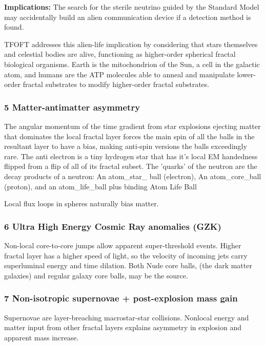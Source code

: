\documentclass[11pt,a4paper]{article}
\begin{document}
      \noindent\textbf{Implications:} The search for the sterile neutrino guided by the Standard Model may accidentally build an alien communication device if a detection method is found.

      TFOFT addresses this alien-life implication by considering that stars themselves and celestial bodies are alive, functioning as higher-order spherical fractal biological organisms. Earth is the mitochondrion of the Sun, a cell in the galactic atom, and humans are the ATP molecules able to anneal and manipulate lower-order fractal substrates to modify higher-order fractal substrates.

    \subsubsection{
    5 Matter-antimatter asymmetry
    }
      The angular momentum of the time gradient from star explosions ejecting matter that dominates the local fractal layer forces the main spin of all the balls in the resultant layer to have a bias, making anti-spin versions the balls exceedingly rare. The anti electron is a tiny hydrogen star that has it's local EM handedness flipped from a flip of all of its fractal subset. The 'quarks' of the neutron are the decay products of a neutron: An atom\_star\_ ball (electron), An atom\_core\_ball (proton), and an atom\_life\_ball plus binding  Atom Life Ball

      Local flux loops in spheres naturally bias matter.


    \subsubsection{
    6 Ultra High Energy Cosmic Ray anomalies (GZK) 
    }
      Non-local core-to-core jumps allow apparent super-threshold events. Higher fractal layer has a higher speed of light, so the velocity of incoming jets carry superluminal energy and time dilation. Both Nude core balls, (the dark matter galaxies) and regular galaxy core balls, may be the source.  


    \subsubsection{
    7 Non-isotropic supernovae + post-explosion mass gain 
    }
       Supernovae are layer-breaching macrostar-star collisions. Nonlocal energy and matter input from other fractal layers explains asymmetry in explosion and apparent mass increase. 
\end{document}
